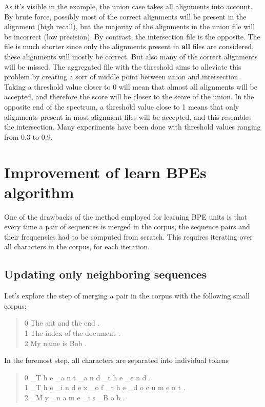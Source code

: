 As it's visible in the example, the union case takes all alignments into account. By brute force, possibly most of the correct alignments will be present in the alignment (high recall), but the majority of the alignments in the union file will be incorrect (low precision). By contrast, the intersection file is the opposite. The file is much shorter since only the alignments present in \textbf{all} files are considered, these alignments will mostly be correct. But also many of the correct alignments will be missed. The aggregated file with the threshold aims to alleviate this problem by creating a sort of middle point between union and intersection. Taking a threshold value closer to 0 will mean that almost all alignments will be accepted, and therefore the score will be closer to the score of the union. In the opposite end of the spectrum, a threshold value close to 1 means that only alignments present in most alignment files will be accepted, and this resembles the intersection. Many experiments have been done with threshold values ranging from 0.3 to 0.9.

\section{Improvement of learn BPEs algorithm}\label{sec:improvlearnbpe}

One of the drawbacks of the method employed for learning BPE units is that every time a pair of sequences is merged in the corpus, the sequence pairs and their frequencies had to be computed from scratch. This requires iterating over all characters in the corpus, for each iteration.

\subsection{Updating only neighboring sequences}

Let's explore the step of merging a pair in the corpus with the following small corpus:

\begin{quote}
	0	The ant and the end .\\
	1 	The index of the document .\\
	2 	My name is Bob .
\end{quote}

In the foremost step, all characters are separated into individual tokens

\begin{quote}
	0	\_T h e \_a n t \_a n d \_t h e \_e n d .\\
	1 	\_T h e \_i n d e x \_o f \_t h e \_d o c u m e n t .\\
	2 	\_M y \_n a m e \_i s \_B o b .
\end{quote}

